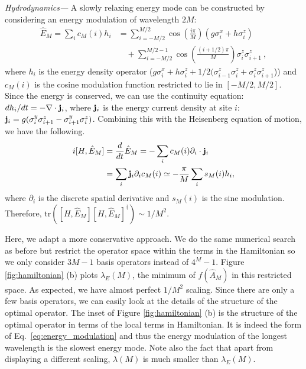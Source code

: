 \documentclass[twocolumn,superscriptaddress, prl,showpacs]{revtex4-1}
\newcommand{\addr}[1]{\textcolor{red}{#1}}
\begin{document}
{\it Hydrodynamics---}
A slowly relaxing energy mode can be constructed by considering an energy modulation of wavelength $2M$:
\begin{align}
\hat{E}_M = \sum_i c_M(i) h_i
&= \sum_{i=-M/2}^{M/2} \cos\left(\frac{i\pi}{M}\right)(g \sigma^x_i + h\sigma^z_i)\nonumber\\
&\quad+ \sum_{i=-M/2}^{M/2-1} \cos\left(\frac{(i+1/2)\pi}{M}\right)\sigma^z_i\sigma^z_{i+1} ~,
\label{eq:energy_modulation}
\end{align}
where $h_i$ is the energy density operator ($g \sigma^x_i + h\sigma^z_i + 1/2(\sigma^z_{i-1}\sigma^z_i + \sigma^z_i\sigma^z_{i+1}$))
and $c_M(i)$ is the cosine modulation function restricted to lie in $[-M/2,M/2]$.
Since the energy is conserved, we can use the continuity equation:
$d h_i/dt = -\nabla \cdot {\bf j}_i$, where ${\bf j}_i$ is the energy current density at site $i$:
${\bf j}_i = g(\sigma^y_i \sigma^z_{i+1} - \sigma^y_{i+1} \sigma^z_i)$.
Combining this with the Heisenberg equation of motion, we have the following.
\begin{align}
 i[H,\hat{E}_M] &= \frac{d}{dt} \hat{E}_M = -\sum_i c_M(i) \partial_i \cdot {\bf j}_i \\
 &= \sum_i {\bf j}_i \partial_i c_M(i) \simeq -\frac{\pi}{M} \sum_i s_M(i) h_i,
\end{align}
where $\partial_i$ is the discrete spatial derivative and $s_M(i)$ is the sine modulation.
Therefore, $\mathrm{tr}([H,\hat{E}_M][H,\hat{E}_M]^\dag) \sim 1/M^2$.

Here, we adapt a more conservative approach.
We do the same numerical search as before but restrict the operator space within the terms in the Hamiltonian
so we only consider $3M-1$ basis operators instead of $4^M-1$.
Figure \ref{fig:hamiltonian} (b) plots $\lambda_E(M)$, the minimum of $f(\hat{A}_M)$ in this restricted space.
As expected, we have almost perfect $1/M^2$ scaling.
Since there are only a few basis operators, we can easily look at the details of the structure of the optimal operator.
The inset of Figure \ref{fig:hamiltonian} (b) is the structure of the optimal operator in terms of the local terms in Hamiltonian.
It is indeed the form of Eq.~\eqref{eq:energy_modulation} and thus the energy modulation of the longest wavelength is the slowest energy mode.
Note also the fact that apart from displaying a different scaling, $\lambda(M)$ is much smaller than $\lambda_E(M)$. 
\end{document}
